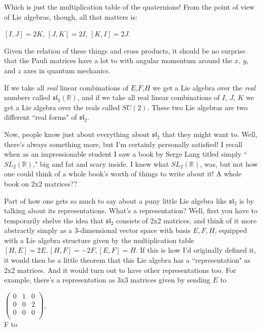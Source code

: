 Which is just the multiplication table of the quaternions! From the point of view of Lie algebras, though, all that matters is:

$[I,J] = 2K$,    $[J,K] = 2I$,    $[K,I] = 2J$.

Given the relation of these things and cross products, it should be no surprise that the Pauli matrices have a lot to with angular momentum around the $x$, $y$, and $z$ axes in quantum mechanics.

If we take all \textit{real} linear combinations of $E$,$F$,$H$ we get a Lie algebra over the \textit{real} numbers called $\mathfrak{sl}_2(\mathbb{R})$, and if we take all real linear combinations of $I$, $J$, $K$ we get a Lie algebra over the reals called $SU(2)$. These two Lie algebras are two different ``real forms" of $\mathfrak{sl}_2$.

Now, people know just about everything about $\mathfrak{sl}_2$ that they might want to. Well, there's always something more, but I'm certainly personally satisfied! I recall when as an impressionable student I saw a book by Serge Lang titled simply ``$SL_2(\mathbb{R})$," big and fat and scary inside. 
I knew what $SL_2(\mathbb{R})$, was, but not how one could think of a whole book's worth of things to write about it! A whole book on 2x2 matrices??

Part of how one gets so much to say about a puny little Lie algebra like $\mathfrak{sl}_2$ is by talking about its representations. What's a representation? Well, first you have to temporarily shelve the idea that $\mathfrak{sl}_2$ consists of 2x2 matrices, and think of it more abstractly simply as a 3-dimensional vector space with basis $E,F,H$, equipped with a Lie algebra structure given by the multiplication table $[H,E] = 2E, [H,F] = -2F, [E,F] = H$. If this is how I'd originally defined it, it would then be a little theorem that this Lie algebra has a ``representation" as 2x2 matrices. And it would turn out to have other representations too. For example, there's a representation as 3x3 matrices given by sending $E$ to

$\begin{pmatrix}
0 & 1 & 0 \\
0 & 0 & 2 \\
0 & 0 & 0 \\
\end{pmatrix}$,
\\



F to
\\

